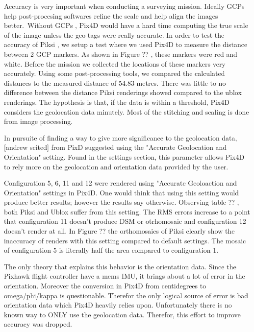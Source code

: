 \documentclass{article}
\begin{document}
Accuracy is very important when conducting a surveying mission. Ideally GCPs help post-procesing softwares refine the scale and help align the images better. Without GCPs , Pix4D would have a hard time computing the true scale of the image unless the geo-tags were really accurate. In order to test the accuracy of Piksi , we setup a test where we used Pix4D to measure the distance between 2 GCP markers. As shown in Figure ?? , these markers were red and white. Before the mission we collected the locations of these markers very accurately. Using some post-processing tools, we compared the calculated distances to the measured distance of 54.83 metres. There was little to no difference between the distance Piksi renderings showed compared to the ublox renderings. The hypothesis is that, if the data is within a threshold, Pix4D considers the geolocation data minutely. Most of the stitching and scaling is done from image processing.

In pursuite of finding a way to give more significance to the geolocation data, [andrew scited] from PixD suggested using the "Accurate Geolocation and Orientation" setting. Found in the settings section, this parameter allows Pix4D to rely more on the geolocation and orientation data provided by the user.

Configuration 5, 6, 11 and 12 were rendered using "Accurate Geoloaction and Orientation" settings in Pix4D. One would think that using this setting would produce better results; however the results say otherwise. Observing table ?? , both Piksi and Ublox suffer from this setting. The RMS errors increase to a point that configuration 11 doesn't produce DSM or otrhomosaic and configuration 12 doesn't render at all. In Figure ?? the orthomosaics of Piksi clearly show the inaccuracy of renders with this setting compared to default settings. The mosaic of configuration 5 is literally half the area compared to configuration 1. 

The only theory that explains this behavior is the orientation data. Since the Pixhawk flight controller have a mems IMU, it brings about a lot of error in the orientation. Moreover the conversion in Pix4D from centidegrees to omega/phi/kappa is questionable. Therefor the only logical source of error is bad orientation data which Pix4D heavily relies upon. Unfortunately there is no known way to ONLY use the geolocation data. Therefor, this effort to improve accuracy was dropped.
\end{document}
